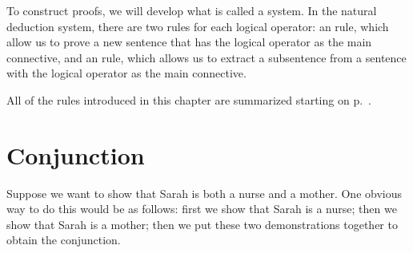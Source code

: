
To construct proofs, we will develop what is called a  system. In the natural deduction system, there are two rules for each logical operator: an  rule, which allow us to prove a new sentence that has the logical operator as the main connective, and an  rule, which allows us to extract a subsentence from a sentence with the logical operator as the main connective.

All of the rules introduced in this chapter are summarized starting on p.~\pageref{ProofRules}.


\section{Conjunction}\label{s:conj-rule}

Suppose we want to show that Sarah is both a nurse and a mother. One obvious way to do this would be as follows: first we show that Sarah is a nurse; then we show that Sarah is a mother; then we put these two demonstrations together to obtain the conjunction.

